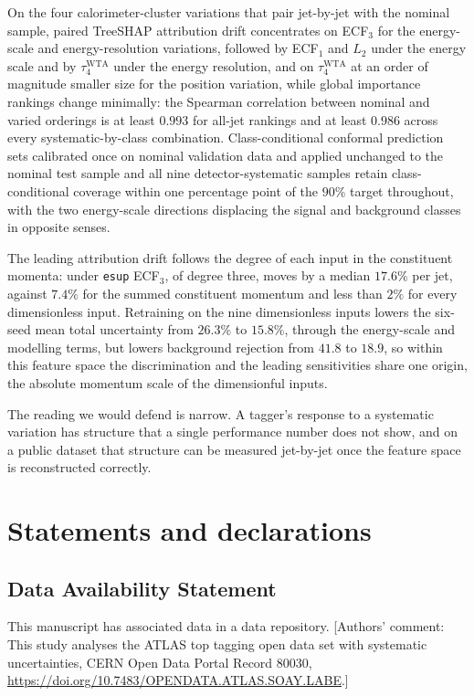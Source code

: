 \documentclass[pdflatex,sn-mathphys,Numbered,iicol]{sn-jnl}
\begin{document}
On the four calorimeter-cluster variations that pair jet-by-jet with the nominal sample,
paired TreeSHAP attribution drift concentrates on ECF$_3$ for the energy-scale and
energy-resolution variations, followed by ECF$_1$ and $L_2$ under the energy scale and
by $\tau_4^{\mathrm{WTA}}$ under the energy resolution, and on $\tau_4^{\mathrm{WTA}}$
at an order of magnitude smaller size for the position variation, while global importance rankings change minimally: the Spearman correlation
between nominal and varied orderings is at least $0.993$ for all-jet rankings and at
least $0.986$ across every systematic-by-class combination. Class-conditional conformal
prediction sets calibrated once on nominal validation data and applied unchanged to the
nominal test sample and all nine detector-systematic samples retain class-conditional
coverage within one percentage point of the $90\%$ target throughout, with the two
energy-scale directions displacing the signal and background classes in opposite senses.

The leading attribution drift follows the degree of each input in the constituent
momenta: under \texttt{esup} ECF$_3$, of degree three, moves by a median $17.6\%$ per jet,
against $7.4\%$ for the summed constituent momentum and less than $2\%$ for every
dimensionless input. Retraining on the nine dimensionless inputs lowers the six-seed
mean total uncertainty from $26.3\%$ to $15.8\%$, through the energy-scale and modelling terms, but
lowers background rejection from $41.8$ to $18.9$, so within this feature space the
discrimination and the leading sensitivities share one origin, the absolute momentum
scale of the dimensionful inputs.

The reading we would defend is narrow. A tagger's response to a systematic variation has
structure that a single performance number does not show, and on a public dataset that
structure can be measured jet-by-jet once the feature space is reconstructed correctly.

\section*{Statements and declarations}

\subsection*{Data Availability Statement}

This manuscript has associated data in a data repository. [Authors' comment: This study
analyses the ATLAS top tagging open data set with systematic uncertainties, CERN Open Data
Portal Record 80030, \url{https://doi.org/10.7483/OPENDATA.ATLAS.SOAY.LABE}.]
\end{document}
